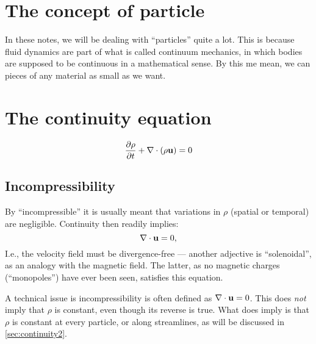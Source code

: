 \section{The concept of particle}

In these notes, we will be dealing with ``particles'' 
quite a lot. This is because fluid dynamics are part of what is called
continuum mechanics, in which bodies are supposed to be continuous in
a mathematical sense. By this me mean, we can pieces of any material
as small as we want. 


\section{The continuity equation}
\label{sec:continuity}

\begin{equation}
  \label{eq:continuity}
  \frac{\partial \rho }{\partial t} +  \nabla \cdot (\rho \mathbf{u} ) = 0 
\end{equation}

\subsection{Incompressibility}

By ``incompressible'' it is usually meant that variations in $\rho$
(spatial or temporal) are negligible. Continuity then readily implies:
\[
\nabla \cdot  \mathbf{u}  = 0 ,
\]
I.e., the velocity field must be divergence-free --- another adjective
is ``solenoidal'', as an analogy with the magnetic field. The latter,
as no magnetic charges (``monopoles'') have ever been seen, satisfies
this equation.

A technical issue is incompressibility is often defined as $\nabla
\cdot \mathbf{u} = 0 $. This does \emph{not} imply that $\rho$ is constant,
even though its reverse is true. What does imply is that $\rho$ is
constant at every particle, or along streamlines, as will be discussed
in \ref{sec:continuity2}.
